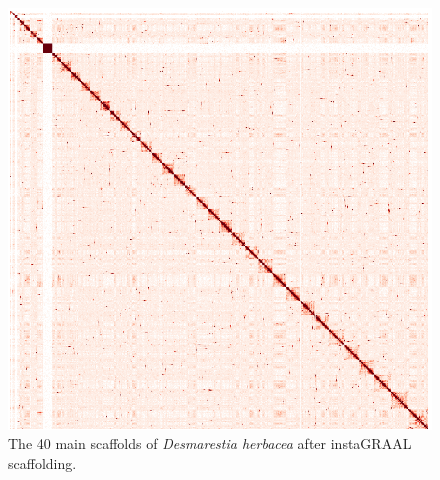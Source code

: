 \begin{suppsection}
\begin{figure}[ht]
\centering
    \includegraphics[width=13.5cm]{fig/instagraal/s4.png}
    \caption{The 40 main scaffolds of \textit{Desmarestia herbacea} after instaGRAAL scaffolding.}
    \label{fig:instagraal_s4}
\end{figure}


\end{suppsection}
